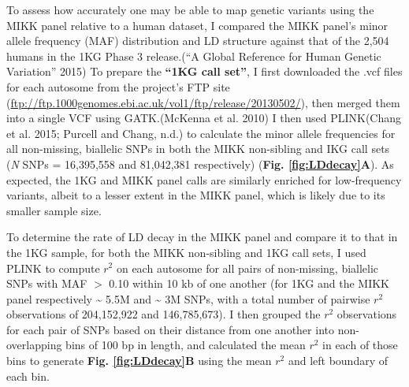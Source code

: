 \documentclass[
]{book}
\begin{document}
To assess how accurately one may be able to map genetic variants using the MIKK panel relative to a human dataset, I compared the MIKK panel's minor allele frequency (MAF) distribution and LD structure against that of the 2,504 humans in the 1KG Phase 3 release.({``A Global Reference for Human Genetic Variation''} 2015) To prepare the \textbf{``1KG call set''}, I first downloaded the .vcf files for each autosome from the project's FTP site (\url{ftp://ftp.1000genomes.ebi.ac.uk/vol1/ftp/release/20130502/}), then merged them into a single VCF using GATK.(McKenna et al. 2010) I then used PLINK(Chang et al. 2015; Purcell and Chang, n.d.) to calculate the minor allele frequencies for all non-missing, biallelic SNPs in both the MIKK non-sibling and IKG call sets (\emph{N} SNPs = 16,395,558 and 81,042,381 respectively) (\textbf{Fig. \ref{fig:LDdecay}A}). As expected, the 1KG and MIKK panel calls are similarly enriched for low-frequency variants, albeit to a lesser extent in the MIKK panel, which is likely due to its smaller sample size.

To determine the rate of LD decay in the MIKK panel and compare it to that in the 1KG sample, for both the MIKK non-sibling and 1KG call sets, I used PLINK to compute \(r^2\) on each autosome for all pairs of non-missing, biallelic SNPs with MAF \(>\) 0.10 within 10 kb of one another (for 1KG and the MIKK panel respectively \textasciitilde{} 5.5M and \textasciitilde{} 3M SNPs, with a total number of pairwise \(r^2\) observations of 204,152,922 and 146,785,673). I then grouped the \(r^2\) observations for each pair of SNPs based on their distance from one another into non-overlapping bins of 100 bp in length, and calculated the mean \(r^2\) in each of those bins to generate \textbf{Fig. \ref{fig:LDdecay}B} using the mean \(r^2\) and left boundary of each bin.
\end{document}
